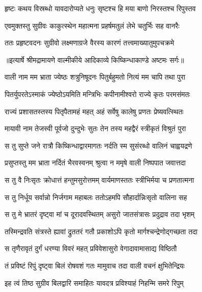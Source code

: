 \twolineshloka
{हृष्टः कथय विस्रब्धो यावदारोप्यते धनुः}
{सृष्टश्च हि मया बाणो निरस्तश्च रिपुस्तव} %

\twolineshloka
{एवमुक्तस्तु सुग्रीवः काकुत्स्थेन महात्मना}
{प्रहर्षमतुलं लेभे चतुर्भिः सह वानरैः} %

\twolineshloka
{ततः प्रहृष्टवदनः सुग्रीवो लक्ष्मणाग्रजे}
{वैरस्य कारणं तत्त्वमाख्यातुमुपचक्रमे} %


{॥इत्यार्षे श्रीमद्रामायणे वाल्मीकीये आदिकाव्ये किष्किन्धाकाण्डे अष्टमः सर्गः॥}


\twolineshloka
{वाली नाम मम भ्राता ज्येष्ठः शत्रुनिषूदनः}
{पितुर्बहुमतो नित्यं मम चापि तथा पुरा} %

\twolineshloka
{पितर्युपरतेऽस्माकं ज्येष्ठोऽयमिति मन्त्रिभिः}
{कपीनामीश्वरो राज्ये कृतः परमसंमतः} %

\twolineshloka
{राज्यं प्रशासतस्तस्य पितृपैतामहं महत्}
{अहं सर्वेषु कालेषु प्रणतः प्रेष्यवत्स्थितः} %

\twolineshloka
{मायावी नाम तेजस्वी पूर्वजो दुन्दुभेः सुतः}
{तेन तस्य महद्वैरं स्त्रीकृतं विश्रुतं पुरा} %

\twolineshloka
{स तु सुप्ते जने रात्रौ किष्किन्धाद्वारमागतः}
{नर्दति स्म सुसंरब्धो वालिनं चाह्वयद्रणे} %

\twolineshloka
{प्रसुप्तस्तु मम भ्राता नर्दितं भैरवस्वनम्}
{श्रुत्वा न ममृषे वाली निष्पपात जवात्तदा} %

\twolineshloka
{स तु वै निःसृतः क्रोधात्तं हन्तुमसुरोत्तमम्}
{वार्यमाणस्ततः स्त्रीभिर्मया च प्रणतात्मना} %

\twolineshloka
{स तु निर्धूय सर्वान्नो निर्जगाम महाबलः}
{ततोऽहमपि सौहार्दान्निःसृतो वालिना सह} %

\twolineshloka
{स तु मे भ्रातरं दृष्ट्वा मां च दूरादवस्थितम्}
{असुरो जातसंत्रासः प्रदुद्राव तदा भृशम्} %

\twolineshloka
{तस्मिन्द्रवति संत्रस्ते ह्यावां द्रुततरं गतौ}
{प्रकाशोऽपि कृतो मार्गश्चन्द्रेणोद्गच्छता तदा} %

\twolineshloka
{स तृणैरावृतं दुर्गं धरण्या विवरं महत्}
{प्रविवेशासुरो वेगादावामासाद्य विष्ठितौ} %

\twolineshloka
{तं प्रविष्टं रिपुं दृष्ट्वा बिलं रोषवशं गतः}
{मामुवाच तदा वाली वचनं क्षुभितेन्द्रियः} %

\twolineshloka
{इह त्वं तिष्ठ सुग्रीव बिलद्वारि समाहितः}
{यावदत्र प्रविश्याहं निहन्मि समरे रिपुम्} %


